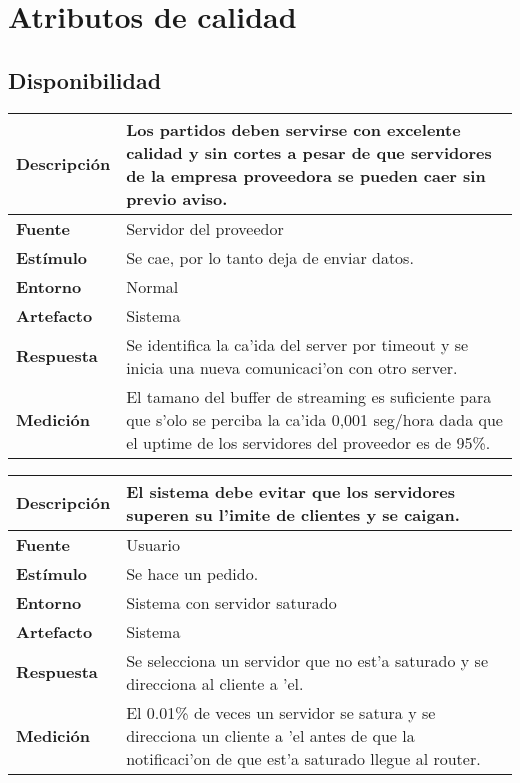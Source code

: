 \section{Atributos de calidad}


\subsection{Disponibilidad}

\begin{center}
  \begin{tabular}{| l | p{10cm} | }
    \hline
  \textbf{Descripción} & Los partidos deben servirse con excelente calidad y sin cortes a pesar de que servidores de la empresa proveedora se pueden caer sin previo aviso.\\  \hline
  \textbf{Fuente} & Servidor del proveedor\\  \hline
  \textbf{Estímulo} & Se cae, por lo tanto deja de enviar datos.\\  \hline
  \textbf{Entorno} & Normal\\  \hline
  \textbf{Artefacto} & Sistema\\  \hline
  \textbf{Respuesta} & Se identifica la ca'ida del server por timeout y se inicia una nueva comunicaci'on con otro server.\\  \hline
  \textbf{Medición} & El tamano del buffer de streaming es suficiente para que s'olo se perciba la ca'ida 0,001 seg/hora dada que el uptime de los servidores del proveedor es de 95\%.\\  \hline
  \end{tabular}
\end{center} 

\begin{center}
  \begin{tabular}{| l | p{10cm} | }
    \hline
  \textbf{Descripción} & El sistema debe evitar que los servidores superen su l'imite de clientes y se caigan.\\  \hline
  \textbf{Fuente} & Usuario\\  \hline
  \textbf{Estímulo} & Se hace un pedido.\\  \hline
  \textbf{Entorno} & Sistema con servidor saturado\\  \hline
  \textbf{Artefacto} & Sistema\\  \hline
  \textbf{Respuesta} & Se selecciona un servidor que no est'a saturado y se direcciona al cliente a 'el.\\  \hline
  \textbf{Medición} & El 0.01\% de veces un servidor se satura y se direcciona un cliente a 'el antes de que la notificaci'on de que est'a saturado llegue al router.\\  \hline
  \end{tabular}
\end{center} 

